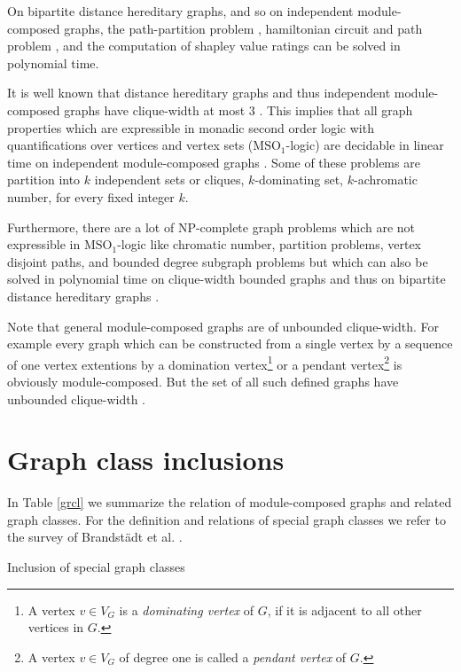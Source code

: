\documentclass[11pt]{article}
\newcommand{\MSOA}{\mbox{MSO}_1}
\begin{document}
On bipartite distance hereditary graphs, and so on independent module-composed graphs, the 
path-partition problem \cite{YC98},
hamiltonian circuit and path problem \cite{MN93},
and the computation of shapley value ratings  \cite{AGKKW06}
can be solved in polynomial time.

It is well known that distance hereditary graphs and
thus independent module-composed graphs have clique-width at most 3 \cite{GR00}. This implies that
all graph properties which are expressible in monadic second order logic with
quantifications over vertices and vertex sets ($\MSOA$-logic) are decidable in
linear time on independent module-composed graphs \cite{CMR00}. Some of these problems are
partition into $k$ independent sets or cliques, $k$-dominating set, $k$-achromatic
number, for every fixed integer $k$.

Furthermore, there are a lot of NP-complete graph problems which are not expressible in
$\MSOA$-logic like chromatic number, partition problems,  vertex disjoint paths, and
bounded degree subgraph problems but which can also be solved in polynomial time on clique-width
bounded graphs and thus on bipartite distance hereditary graphs \cite{EGW01a,GW06}. 

Note that general module-composed graphs are of unbounded clique-width. 
For example every graph which can be constructed from a single
vertex by a sequence of one vertex extentions by a domination vertex\footnote{A vertex $v\in V_G$ is a {\em dominating vertex} of $G$, if it is adjacent to all other vertices in $G$.} or a
pendant vertex\footnote{A vertex $v\in V_G$ of degree one is called a {\em pendant vertex} of $G$.} is 
obviously module-composed. But the set of all such defined graphs
have unbounded clique-width  \cite{Rao07}.


\section{Graph class inclusions}




In Table \ref{grcl} we summarize the relation of module-composed graphs
and related graph classes. For the definition and relations of special graph classes
we refer to the survey of Brandst\"adt  et al. \cite{BLS99}.

\begin{table}
\begin{center}
\caption{Inclusion of special graph classes}\label{grcl}
\end{center}
\end{table}










\end{document}
